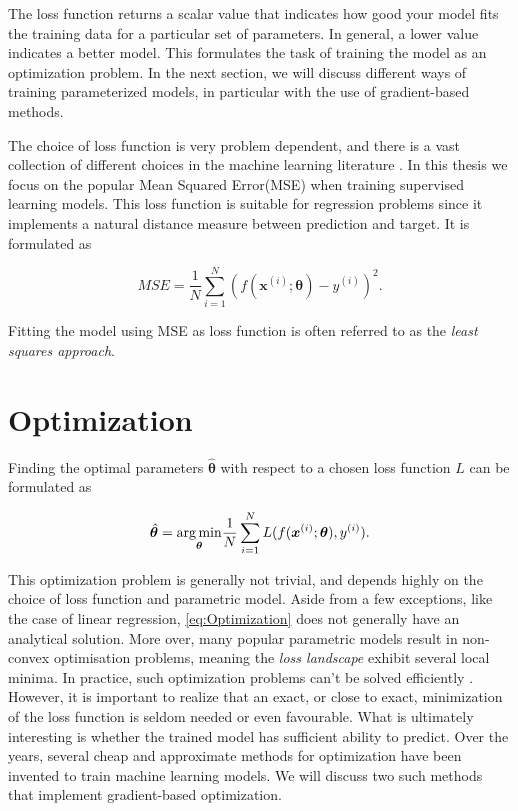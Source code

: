 The loss function returns a scalar value that indicates how good your model fits the training data for a particular set of parameters. In general, a lower value indicates a better model. This formulates the task of training the model as an optimization problem. In the next section, we will discuss different ways of training parameterized models, in particular with the use of gradient-based methods.

The choice of loss function is very problem dependent, and there is a vast collection of different choices in the machine learning literature \cite{hastie01statisticallearning}. In this thesis we focus on the popular Mean Squared Error(MSE) when training supervised learning models. This loss function is suitable for regression problems since it implements a natural distance measure between prediction and target. It is formulated as

\begin{equation}\label{eq:MSE}
    MSE = \frac{1}{N}\sum_{i=1}^{N} (f(\boldsymbol{x}^{(i)}; \boldsymbol{\theta}) - y^{(i)})^2.
\end{equation}

Fitting the model using MSE as loss function is often referred to as the \emph{least squares approach}.

\section{Optimization}\label{sec:Optimization}
Finding the optimal parameters $\hat{\boldsymbol{\theta}}$ with respect to a chosen loss function $L$ can be formulated as

\begin{equation}\label{eq:Optimization}
    \hat{\boldsymbol{\theta}} = \underset{\boldsymbol{\theta}}{\operatorname*{arg\,min}} \frac{1}{N}\sum_{i=1}^{N} L(f(\boldsymbol{x}^{(i)}; \boldsymbol{\theta}) , y^{(i)}).
\end{equation}

This optimization problem is generally not trivial, and depends highly on the choice of loss function and parametric model. Aside from a few exceptions, like the case of linear regression, \autoref{eq:Optimization} does not generally have an analytical solution. More over, many popular parametric models result in non-convex optimisation problems, meaning the \emph{loss landscape} exhibit several local minima. In practice, such optimization problems can't be solved efficiently \cite{Vava:book}. However, it is important to realize that an exact, or close to exact, minimization of the loss function is seldom needed or even favourable. What is ultimately interesting is whether the trained model has sufficient ability to predict. Over the years, several cheap and approximate methods for optimization have been invented to train machine learning models. We will discuss two such methods that implement gradient-based optimization. 

